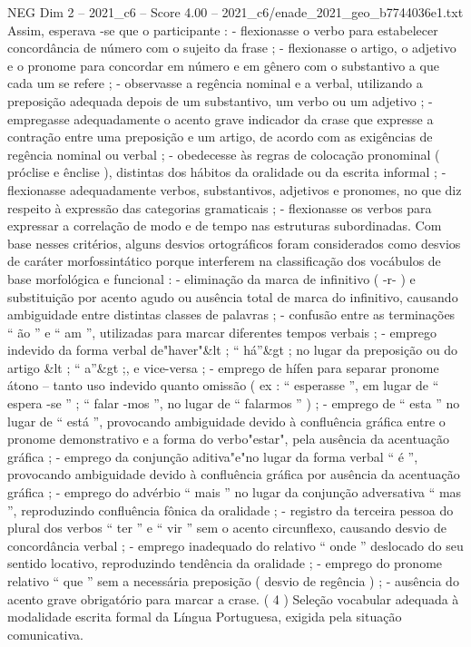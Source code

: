 \begin{textsample}{NEG Dim 2 – 2021\_c6 – Score 4.00 – 2021\_c6/enade\_2021\_geo\_b7744036e1.txt}
Assim, esperava -se que o participante : - flexionasse o verbo para estabelecer concordância de número com o sujeito da frase ; - flexionasse o artigo, o adjetivo e o pronome para concordar em número e em gênero com o substantivo a que cada um se refere ; - observasse a regência nominal e a verbal, utilizando a preposição adequada depois de um substantivo, um verbo ou um adjetivo ; - empregasse adequadamente o acento grave indicador da crase que expresse a contração entre uma preposição e um artigo, de acordo com as exigências de regência nominal ou verbal ; - obedecesse às regras de colocação pronominal ( próclise e ênclise ), distintas dos hábitos da oralidade ou da escrita informal ; - flexionasse adequadamente verbos, substantivos, adjetivos e pronomes, no que diz respeito à expressão das categorias gramaticais ; - flexionasse os verbos para expressar a correlação de modo e de tempo nas estruturas subordinadas.
Com base nesses critérios, alguns desvios ortográficos foram considerados como desvios de caráter morfossintático porque interferem na classificação dos vocábulos de base morfológica e funcional : - eliminação da marca de infinitivo ( -r- ) e substituição por acento agudo ou ausência total de marca do infinitivo, causando ambiguidade entre distintas classes de palavras ; - confusão entre as terminações “ ão ” e “ am ”, utilizadas para marcar diferentes tempos verbais ; - emprego indevido da forma verbal de"haver"\&lt ; “ há”\&gt ; no lugar da preposição ou do artigo \&lt ; “ a”\&gt ;, e vice-versa ; - emprego de hífen para separar pronome átono – tanto uso indevido quanto omissão ( ex : “ esperasse ”, em lugar de “ espera -se ” ; “ falar -mos ”, no lugar de “ falarmos ” ) ; - emprego de “ esta ” no lugar de “ está ”, provocando ambiguidade devido à confluência gráfica entre o pronome demonstrativo e a forma do verbo"estar", pela ausência da acentuação gráfica ; - emprego da conjunção aditiva"e"no lugar da forma verbal “ é ”, provocando ambiguidade devido à confluência gráfica por ausência da acentuação gráfica ; - emprego do advérbio “ mais ” no lugar da conjunção adversativa “ mas ”, reproduzindo confluência fônica da oralidade ; - registro da terceira pessoa do plural dos verbos “ ter ” e “ vir ” sem o acento circunflexo, causando desvio de concordância verbal ; - emprego inadequado do relativo “ onde ” deslocado do seu sentido locativo, reproduzindo tendência da oralidade ; - emprego do pronome relativo “ que ” sem a necessária preposição ( desvio de regência ) ; - ausência do acento grave obrigatório para marcar a crase. ( 4 ) Seleção vocabular adequada à modalidade escrita formal da Língua Portuguesa, exigida pela situação comunicativa.

\end{textsample}
